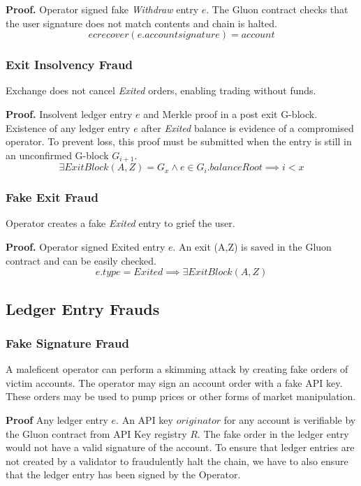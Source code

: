 \documentclass[12pt,a4paper]{article}
\begin{document}
\textbf{Proof.} Operator signed fake \emph{Withdraw} entry $e$. The Gluon contract checks that the user signature does not match contents and chain is halted.
\begin{equation}
ecrecover(e.accountsignature) = account
\end{equation}


\subsubsection{Exit Insolvency Fraud}\label{fp:eif}
Exchange does not cancel \emph{Exited} orders, enabling trading without funds.

\textbf{Proof.} Insolvent ledger entry $e$ and Merkle proof in a post exit G-block. Existence of any ledger entry $e$ after \emph{Exited} balance is evidence of a compromised operator. To prevent loss, this proof must be submitted when the entry is still in an unconfirmed G-block $G_{i+1}$.
\begin{equation}
\exists ExitBlock(A,Z) = G_x \wedge e \in G_{i}.balanceRoot \implies i < x
\end{equation}

\subsubsection{Fake Exit Fraud}\label{fp:fef}
Operator creates a fake \emph{Exited} entry to grief the user.

\textbf{Proof.} Operator signed Exited entry $e$. An exit (A,Z) is saved in the Gluon contract and can be easily checked.
\begin{equation}
    e.type=Exited \implies \exists ExitBlock(A,Z)
\end{equation}

\subsection{Ledger Entry Frauds}
\subsubsection{Fake Signature Fraud} \label{fp:fsf}
A maleficent operator can perform a skimming attack by creating fake orders of victim accounts. The operator may sign an account order with a fake API key\cite{levzkapi}. These orders may be used to pump prices or other forms of market manipulation.

\textbf{Proof}
Any ledger entry $e$. An API key $originator$ for any account is verifiable by the Gluon contract from API Key registry $R$. The fake order in the ledger entry would not have a valid signature of the account. To ensure that ledger entries are not created by a validator to fraudulently halt the chain, we have to also ensure that the ledger entry has been signed by the Operator.
\end{document}
